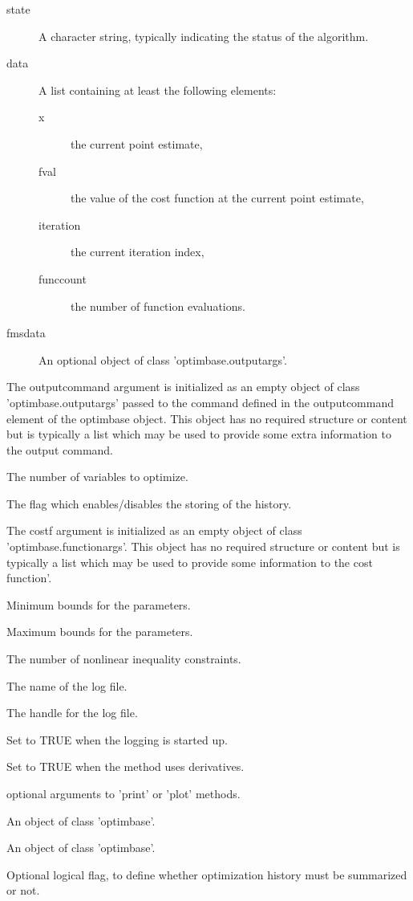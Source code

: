 \begin{Arguments}
\begin{ldescription}
\begin{description}
\item[state] A character string, typically indicating the status of the
algorithm.
\item[data] A list containing at least the following elements:
\begin{description}

\item[x] the current point estimate,
\item[fval] the value of the cost function at the current point
estimate,
\item[iteration] the current iteration index,
\item[funccount] the number of function evaluations.

\end{description}


\item[fmsdata] An optional object of class 'optimbase.outputargs'.

\end{description}

\item[\code{outputcommandarg}] The outputcommand argument is initialized as an empty
object of class 'optimbase.outputargs' passed to the command defined in 
the outputcommand element of the optimbase object. This object has no 
required structure or content but is typically a list which may be used to
provide some extra information to the output command.
\item[\code{numberofvariables}] The number of variables to optimize.
\item[\code{storehistory}] The flag which enables/disables the storing of the
history.
\item[\code{costfargument}] The costf argument is initialized as an empty object of 
class 'optimbase.functionargs'. This object has no required structure or
content but is typically a list which may be used to provide some 
information to the cost function'.
\item[\code{boundsmin}] Minimum bounds for the parameters.
\item[\code{boundsmax}] Maximum bounds for the parameters.
\item[\code{nbineqconst}] The number of nonlinear inequality constraints. 
\item[\code{logfile}] The name of the log file.
\item[\code{logfilehandle}] The handle for the log file.
\item[\code{logstartup}] Set to TRUE when the logging is started up.
\item[\code{withderivatives}] Set to TRUE when the method uses derivatives.
\item[\code{...}] optional arguments to 'print' or 'plot' methods.
\item[\code{x}] An object of class 'optimbase'.
\item[\code{object}] An object of class 'optimbase'.
\item[\code{showhistory}] Optional logical flag, to define whether optimization 
history must be summarized or not.
\end{ldescription}
\end{Arguments}
